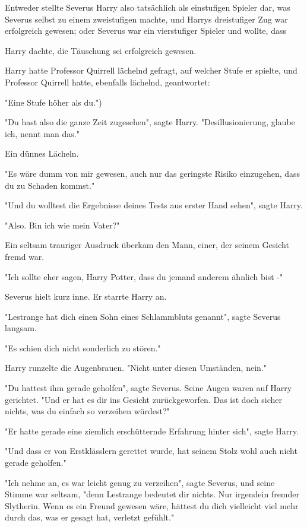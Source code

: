 {Entweder stellte Severus Harry also tatsächlich als einstufigen Spieler dar, was Severus selbst zu einem zweistufigen machte, und Harrys dreistufiger Zug war erfolgreich gewesen; oder Severus war ein vierstufiger Spieler und wollte, dass

Harry dachte, die Täuschung sei erfolgreich gewesen.

Harry hatte Professor Quirrell lächelnd gefragt, auf welcher Stufe er spielte, und Professor Quirrell hatte, ebenfalls lächelnd, geantwortet:

"Eine Stufe höher als du.")

"Du hast also die ganze Zeit zugesehen", sagte Harry. "Desillusionierung, glaube ich, nennt man das."

Ein dünnes Lächeln.

"Es wäre dumm von mir gewesen, auch nur das geringste Risiko einzugehen, dass du zu Schaden kommst."

"Und du wolltest die Ergebnisse deines Tests aus erster Hand sehen", sagte Harry.

"Also. Bin ich wie mein Vater?"

Ein seltsam trauriger Ausdruck überkam den Mann, einer, der seinem Gesicht fremd war.

"Ich sollte eher sagen, Harry Potter, dass du jemand anderem ähnlich bist -"

Severus hielt kurz inne. Er starrte Harry an.

"Lestrange hat dich einen Sohn eines Schlammbluts genannt", sagte Severus langsam.

"Es schien dich nicht sonderlich zu stören."

Harry runzelte die Augenbrauen. "Nicht unter diesen Umständen, nein."

"Du hattest ihm gerade geholfen", sagte Severus. Seine Augen waren auf Harry gerichtet. "Und er hat es dir ins Gesicht zurückgeworfen. Das ist doch sicher nichts, was du einfach so verzeihen würdest?"

"Er hatte gerade eine ziemlich erschütternde Erfahrung hinter sich", sagte Harry.

"Und dass er von Erstklässlern gerettet wurde, hat seinem Stolz wohl auch nicht gerade geholfen."

"Ich nehme an, es war leicht genug zu verzeihen", sagte Severus, und seine Stimme war seltsam, "denn Lestrange bedeutet dir nichts. Nur irgendein fremder Slytherin. Wenn es ein Freund gewesen wäre, hättest du dich vielleicht viel mehr durch das, was er gesagt hat, verletzt gefühlt."

}
